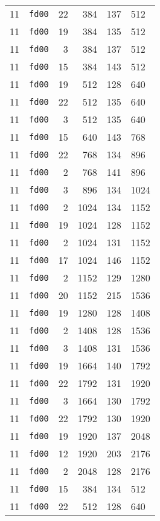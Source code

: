 \documentclass{article}
\begin{document}
\begin{table}[h!]
\begin{tabular}{llrrrl}
    11 & \texttt{fd00} & 22 & 384 & 137 & 512 \\
    11 & \texttt{fd00} & 19 & 384 & 135 & 512 \\
    11 & \texttt{fd00} & 3 & 384 & 137 & 512 \\
    11 & \texttt{fd00} & 15 & 384 & 143 & 512 \\
    11 & \texttt{fd00} & 19 & 512 & 128 & 640 \\
    11 & \texttt{fd00} & 22 & 512 & 135 & 640 \\
    11 & \texttt{fd00} & 3 & 512 & 135 & 640 \\
    11 & \texttt{fd00} & 15 & 640 & 143 & 768 \\
    11 & \texttt{fd00} & 22 & 768 & 134 & 896 \\
    11 & \texttt{fd00} & 2 & 768 & 141 & 896 \\
    11 & \texttt{fd00} & 3 & 896 & 134 & 1024 \\
    11 & \texttt{fd00} & 2 & 1024 & 134 & 1152 \\
    11 & \texttt{fd00} & 19 & 1024 & 128 & 1152 \\
    11 & \texttt{fd00} & 2 & 1024 & 131 & 1152 \\
    11 & \texttt{fd00} & 17 & 1024 & 146 & 1152 \\
    11 & \texttt{fd00} & 2 & 1152 & 129 & 1280 \\
    11 & \texttt{fd00} & 20 & 1152 & 215 & 1536 \\
    11 & \texttt{fd00} & 19 & 1280 & 128 & 1408 \\
    11 & \texttt{fd00} & 2 & 1408 & 128 & 1536 \\
    11 & \texttt{fd00} & 3 & 1408 & 131 & 1536 \\
    11 & \texttt{fd00} & 19 & 1664 & 140 & 1792 \\
    11 & \texttt{fd00} & 22 & 1792 & 131 & 1920 \\
    11 & \texttt{fd00} & 3 & 1664 & 130 & 1792 \\
    11 & \texttt{fd00} & 22 & 1792 & 130 & 1920 \\
    11 & \texttt{fd00} & 19 & 1920 & 137 & 2048 \\
    11 & \texttt{fd00} & 12 & 1920 & 203 & 2176 \\
    11 & \texttt{fd00} & 2 & 2048 & 128 & 2176 \\
    11 & \texttt{fd00} & 15 & 384 & 134 & 512 \\
    11 & \texttt{fd00} & 22 & 512 & 128 & 640 \\

\end{tabular}
\end{table}
\end{document}
